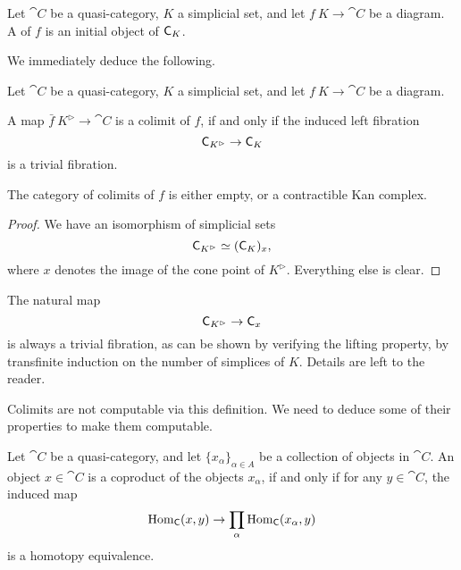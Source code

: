 \begin{definition}
    Let $\cat C$ be a quasi-category,
    $K$ a simplicial set,
    and let $f\:K\to\cat C$ be a diagram.
    A  of $f$ is an initial object of $\mathsf{C}_{K\/}$.
\end{definition}

We immediately deduce the following.

\begin{corollary}
    Let $\cat C$ be a quasi-category,
    $K$ a simplicial set,
    and let $f\:K\to\cat C$ be a diagram.
    \begin{itms}
        \item A map $\bar f\:K^\vartriangleright\to\cat C$
        is a colimit of $f$, if and only if
        the induced left fibration
        \[ \mathsf{C}_{K^\vartriangleright\/}\to\mathsf{C}_{K\/} \]
        is a trivial fibration.
        \item The category of colimits of $f$ 
        is either empty, or a contractible Kan complex.
    \end{itms}
\end{corollary}

\begin{proof}
    We have an isomorphism of simplicial sets
    \[ \mathsf{C}_{K^\vartriangleright\/}\simeq(\mathsf{C}_{K\/})_{x\/}, \]
    where $x$ denotes the image of the cone point of $K^\vartriangleright$.
    Everything else is clear.
\end{proof}

\begin{remark}\label{thm-6-c}
    The natural map 
    \[ \mathsf{C}_{K^\vartriangleright\/}\to\mathsf{C}_{x\/} \]
    is always a trivial fibration,
    as can be shown by verifying the lifting property,
    by transfinite induction on the number of simplices of $K$.
    Details are left to the reader. \varqed
\end{remark}

Colimits are not computable via this definition.
We need to deduce some of their properties to make them computable.

\begin{proposition}\label{thm-6-z}
    Let $\cat C$ be a quasi-category,
    and let $\{x_\alpha\}_{\alpha\in A}$ be a collection of objects in $\cat C$.
    An object $x\in\cat C$ is a coproduct of the objects $x_\alpha$,
    if and only if for any $y\in\cat C$, the induced map 
    \[ \operatorname{Hom}_{\mathsf{C}}(x,y)\to\prod_\alpha\operatorname{Hom}_{\mathsf{C}}(x_\alpha,y) \]
    is a homotopy equivalence.
\end{proposition}

